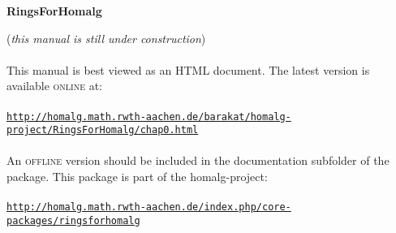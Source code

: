 \documentclass[a4paper,11pt]{report}
\begin{document}
\begin{titlepage}
\begin{center}{\Huge \textbf{\textsf{RingsForHomalg}\mbox{}}}
\begin{minipage}{12cm}
(\emph{this manual is still under construction}) \\
\\
 This manual is best viewed as an \textsc{HTML} document. The latest version is available \textsc{online} at: \\
\\
 \href{http://homalg.math.rwth-aachen.de/~barakat/homalg-project/RingsForHomalg/chap0.html} {\texttt{http://homalg.math.rwth-aachen.de/\texttt{}barakat/homalg-project/RingsForHomalg/chap0.html}} \\
\\
 An \textsc{offline} version should be included in the documentation subfolder of the package. This
package is part of the \textsf{homalg}-project: \\
\\
 \href{http://homalg.math.rwth-aachen.de/index.php/core-packages/ringsforhomalg} {\texttt{http://homalg.math.rwth-aachen.de/index.php/core-packages/ringsforhomalg}} \end{minipage}

\end{center}\vfill


\end{titlepage}
\end{document}
